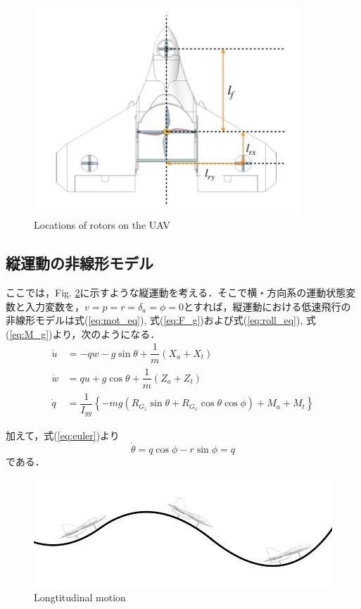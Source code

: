 \begin{figure}[H]
	\centering
	\includegraphics[clip,width=10.0cm,bb=0 0 800 630]{./z_figure_files/chapter3/3_distance.jpeg}
	\caption{Locations of rotors on the UAV}
	\label{fig:distance}
\end{figure}

\subsection{縦運動の非線形モデル}
\label{sec:lng_non_linear}

ここでは，Fig. \ref{fig:longtitude}に示すような縦運動を考える．そこで横・方向系の運動状態変数と入力変数を，$v=p=r=\delta_a=\phi=0$とすれば，縦運動における低速飛行の非線形モデルは式(\ref{eq:mot_eq}), 式(\ref{eq:F_g})および式(\ref{eq:roll_eq}), 式(\ref{eq:M_g})より，次のようになる．
\begin{align}
  \dot{u} &= -qw - g\sin\theta +\dfrac{1}{m}(X_a + X_t) \label{eq:u_dot} \\
  \dot{w} &= qu + g\cos\theta +\dfrac{1}{m}(Z_a + Z_t)  \\
  \dot{q} &= \dfrac{1}{I_{yy}}\left\{-mg(R_{G_z}\sin\theta+R_{G_x}\cos\theta\cos\phi) + M_a + M_t\right\} \label{eq:theta_dot}
\end{align}

加えて，式(\ref{eq:euler})より
\begin{equation}
  \dot{\theta} = q\cos\phi - r\sin\phi = q
\end{equation}
である．

\begin{figure}[H]
	\centering
	\includegraphics[clip,width=12.0cm,bb=0 0 820 300]{./z_figure_files/chapter3/4_longtitude.jpeg}
	\caption{Longtitudinal motion}
	\label{fig:longtitude}
\end{figure}


